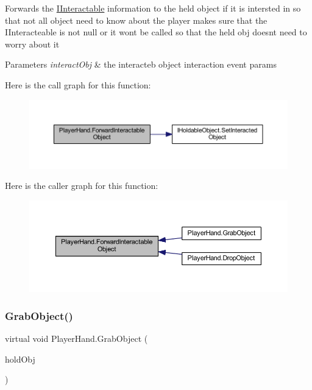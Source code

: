 Forwards the \mbox{\hyperlink{interface_i_interactable}{I\+Interactable}} information to the held object if it is intersted in so that not all object need to know about the player makes sure that the I\+Interacteable is not null or it wont be called so that the held obj doesn\textquotesingle{}t need to worry about it 


\begin{DoxyParams}{Parameters}
{\em interact\+Obj} & the interacteb object interaction event params\\
\hline
\end{DoxyParams}
Here is the call graph for this function\+:
\nopagebreak
\begin{figure}[H]
\begin{center}
\leavevmode
\includegraphics[width=350pt]{class_player_hand_a67095e4c1db1e3369c435dd1fe1ebec5_cgraph}
\end{center}
\end{figure}
Here is the caller graph for this function\+:
\nopagebreak
\begin{figure}[H]
\begin{center}
\leavevmode
\includegraphics[width=350pt]{class_player_hand_a67095e4c1db1e3369c435dd1fe1ebec5_icgraph}
\end{center}
\end{figure}
\mbox{\label{class_player_hand_a64a86af904a77f4a0b92d72bd5fdf43c}} 
\subsubsection{\texorpdfstring{Grab\+Object()}{GrabObject()}}
{\footnotesize\ttfamily virtual void Player\+Hand.\+Grab\+Object (\begin{DoxyParamCaption}\item[{\mbox{\hyperlink{interface_i_holdable_object}{I\+Holdable\+Object}}}]{hold\+Obj }\end{DoxyParamCaption})\hspace{0.3cm}{\ttfamily [virtual]}}



